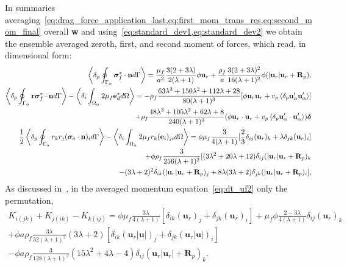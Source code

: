 In summaries averaging~\ref{eq:drag_force_application_last,eq:first_mom_trans_res,eq:second_mom_final} overall \textbf{w} and using~\ref{eq:standard_dev1,eq:standard_dev2} we obtain the ensemble averaged zeroth, first, and second moment of forces, which read, in dimensional form: 
\begin{align}
    \label{eq:forces_reformulated1_avg}
    \pSavg{\bm\sigma_f^*\cdot \textbf{n}}
    =
    \frac{\mu_f}{a^2}  \frac{3(2+3\lambda)}{2(\lambda+1)} \phi \textbf{u}_r 
    + \frac{\rho_f}{a} \frac{3 (2+3\lambda)^2}{16 (\lambda+1)^2}
    \phi (|\textbf{u}_r| \textbf{u}_r+ \textbf{R}_p),\\
    \pSavg{\textbf{r}\bm\sigma_f^*\cdot \textbf{n}}
    - \pOavg[i]{2\mu_f \textbf{e}^*_d}
    = 
    - \rho_f  \frac{63 \lambda^{3} + 150 \lambda^{2} + 112 \lambda + 28}{80 (\lambda+1)^{3}} [\phi \textbf{u}_r \textbf{u}_r + v_p \pavg{\textbf{u}_\alpha'\textbf{u}_\alpha'} ] \nonumber \\ 
    + \rho_f   \frac{48\lambda^3 + 105 \lambda^2 + 62\lambda + 8}{240 (\lambda+1)^3} (\phi \textbf{u}_r\cdot \textbf{u}_r+ v_p \pavg{\textbf{u}_\alpha'\cdot \textbf{u}_\alpha'}) \bm\delta
    \label{eq:forces_reformulated2_avg}\\
    \frac{1}{2}\pSavg{r_kr_j ( \bm\sigma_{o}\cdot \textbf{n})_i}
    - \pOavg[i]{2 \mu_f r_k (\textbf{e}_i)_{ji}}
    =
    \phi \mu_f \frac{ 3}{4(\lambda+1)} [
        \frac{2}{3}\delta_{ij} (\textbf{u}_r)_k 
        + \lambda \delta_{jk} (\textbf{u}_r)_i
    ]\nonumber\\ 
    + \phi \rho_f 
    \frac{3}{256(\lambda+1)^2} [
    (3\lambda^2+20\lambda +12) \delta_{ij} ( |\textbf{u}_r| \textbf{u}_r+\textbf{R}_p)_k\nonumber \\
    -( 3\lambda+2)^2 \delta_{ik} (|\textbf{u}_r| \textbf{u}_r+\textbf{R}_p)_j
    + 8 \lambda (3\lambda+2)\delta_{jk}  (|\textbf{u}_r| \textbf{u}_r +\textbf{R}_p)_i
    ], 
    \label{eq:forces_reformulated3_avg}
\end{align}
As discussed in~\cite[Eq. (5.35)]{fintzi2025averaged}, in the averaged momentum equation~\ref{eq:dt_uf2} only the permutation, 
\begin{multline}
    K_{i(jk)}
    + K_{j(ik)}
    - K_{k(ij)}
    =
    \phi \mu_f \frac{3\lambda}{4(\lambda+1)} [\delta_{ik} (\textbf{u}_r)_j + \delta_{jk} (\textbf{u}_r)_i]
    + \mu_f \phi  \frac{ 2 - 3\lambda}{4(\lambda+1)}  \delta_{ij} (\textbf{u}_r)_k\\
    + \phi a \rho_f \frac{ 3\lambda}{32(\lambda+1)^2} ( 3\lambda+2) [\delta_{ik} (\textbf{u}_r|\textbf{u}|)_j + \delta_{jk} (\textbf{u}_r|\textbf{u}|)_i]\\
    - 
    \phi a \rho_f \frac{3}{128(\lambda+1)^2} ( 15\lambda^2+4\lambda -4) \delta_{ij} (\textbf{u}_r|\textbf{u}_r|+\textbf{R}_p)_k.
    \label{eq:symmetry}
\end{multline}
